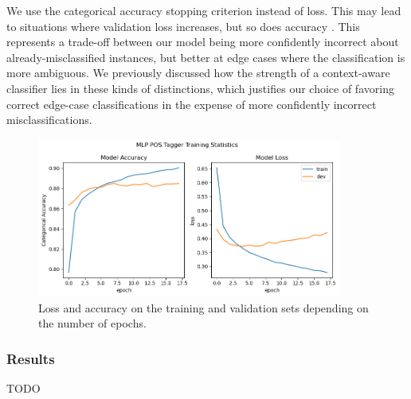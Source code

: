 \documentclass[11pt, a4paper]{article}
\begin{document}
	We use the categorical accuracy stopping criterion instead of loss. This may lead to situations where validation loss increases, but so does accuracy \cite{loss-accuracy}. This represents a trade-off between our model being more confidently incorrect about already-misclassified instances, but better at edge cases where the classification is more ambiguous. We previously discussed how the strength of a context-aware classifier lies in these kinds of distinctions, which justifies our choice of favoring correct edge-case classifications in the expense of more confidently incorrect misclassifications.
	
	\begin{figure}
		\centering
		\includegraphics[width=10cm]{"ex_10_fit.png"}
		\caption{Loss and accuracy on the training and validation sets depending on the number of epochs.}
		\label{fig::common_words}
	\end{figure}
	
	\subsubsection{Results}
	
	TODO
	
	\printbibliography
	
\end{document}
